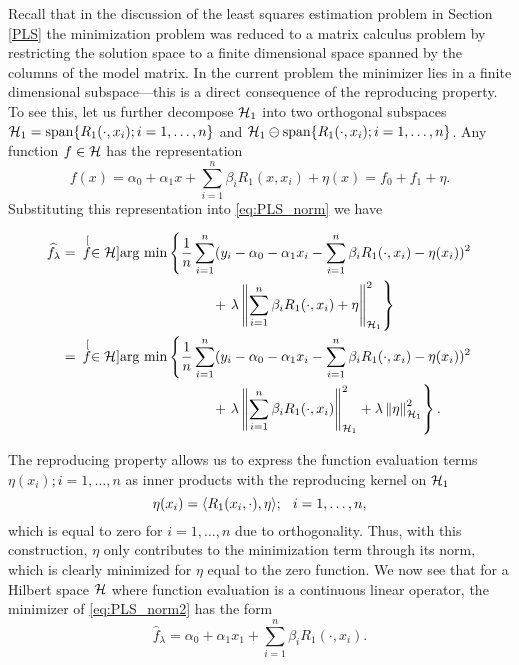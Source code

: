 Recall that in the discussion of the least squares estimation problem in Section \ref{PLS} the minimization problem was reduced to a matrix calculus problem by restricting the solution space to a finite dimensional space spanned by the columns of the model matrix. In the current problem the minimizer lies in a finite dimensional subspace---this is a direct consequence of the reproducing property. To see this, let us further decompose $\mathcal{H}_1$ into two orthogonal subspaces $\mathcal{H}_1 =\mbox{span}\{R_1(\cdot,x_i); i = 1,\dots, n\}$ and $\mathcal{H}_1\ominus \mbox{span}\{R_1(\cdot,x_i); i = 1,\dots, n\}$. Any function $f \in  \mathcal{H}$  has the representation 
\begin{equation*}
f(x) = \alpha_0 + \alpha_1x + \sum_{i=1}^n \beta_iR_1(x, x_i) + \eta(x)=f_0 + f_{1} + \eta.
\label{eq:ds_representation} %
\end{equation*}
Substituting this representation into \eqref{eq:PLS_norm} we have 

\begin{align}
\widehat{f}_{\lambda} &= \hspace{.07in}\stackrel[f \in \mathcal{H}]{}{\mbox{arg min}} 
\left\{ \frac{1}{n}\sum_{i=1}^{n}(y_i - \alpha_0 - \alpha_1x_i - \sum_{i=1}^n \beta_iR_1(\cdot, x_i) - \eta(x_i))^2 \right. \nonumber \\
	 & \mbox{\hspace{1.5in}} + \left. \lambda\left\|\sum_{i=1}^n \beta_iR_1(\cdot, x_i) + \eta\right\|^2_{\mathcal{H}_1} \right\} \nonumber \\
	 & = \hspace{.07in}\stackrel[f \in \mathcal{H}]{}{\mbox{arg min}} \left\{ \frac{1}{n}\sum_{i=1}^{n}(y_i - \alpha_0 - \alpha_1x_i - \sum_{i=1}^n \beta_iR_1(\cdot, x_i) - \eta(x_i))^2 \right. \nonumber \\
  & \mbox{\hspace{1.5in}} + \left. \lambda\left\|\sum_{i=1}^n \beta_iR_1(\cdot, x_i) \right\|^2_{\mathcal{H}_1} + \lambda\left\|\eta\right\|^2_{\mathcal{H}_1} \right\}.
\label{eq:PLS_norm2}
\end{align}

The reproducing property allows us to express the function evaluation terms $\eta(x_i); i = 1,\dots, n$ as inner products with the reproducing kernel on $\mathcal{H}_1$
\begin{equation*}
\eta(x_i) = \langle R_1(x_i,\cdot), \eta \rangle; \hspace{0.1in} i = 1,\dots,n,
\label{eq:rep_property}
\end{equation*}
which is equal to zero for $i=1,\dots,n$ due to orthogonality. Thus, with this construction, $\eta$ only contributes to the minimization term through its norm, which is clearly minimized for $\eta$ equal to the zero function. We now see that for a Hilbert space $\mathcal{H}$ where function evaluation is a continuous linear operator, the minimizer of \eqref{eq:PLS_norm2} has the form 
\begin{equation}
\widehat{f}_{\lambda} = \alpha_0 + \alpha_1x_1 + \sum_{i=1}^n \beta_iR_1(\cdot, x_i).
\label{eq:solution_form}
\end{equation}


